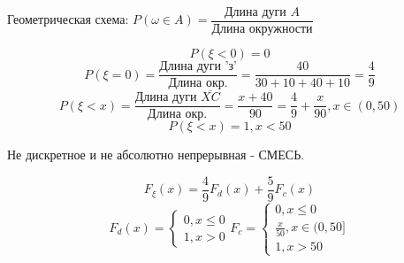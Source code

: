 \noindent Геометрическая схема: $P(\omega \in A) = \dfrac{\text{Длина дуги } A}{\text{Длина окружности}}$
\begin{figure}[H]
\end{figure}
\[ P(\xi < 0) = 0 \]
\[ P(\xi = 0) = \frac{\text{Длина дуги 'з'}}{\text{Длина окр.}} = \frac{40}{30 + 10 + 40 + 10} = \frac{4}{9} \]
\[ P(\xi < x) = \frac{\text{Длина дуги } \overline{XC}}{\text{Длина окр.}} = \frac{x+40}{90} = \frac{4}{9} + \frac{x}{90}, x \in (0,50) \]
\[ P(\xi < x) = 1, x < 50 \]
\begin{remark}
	Не дискретное и не абсолютно непрерывная - СМЕСЬ.
\end{remark}
\[ F_{\xi} (x) = \frac{4}{9} F_d (x) + \frac{5}{9} F_c(x) \]
\[
F_d(x) =
\begin{cases}
	0, x \le 0 \\
	1, x > 0
\end{cases}
F_c =
\begin{cases}
	0, x \le 0 \\
	\frac{x}{50}, x \in (0,50] \\
	1, x > 50
\end{cases}
\]
\begin{figure}[H]
\end{figure}

